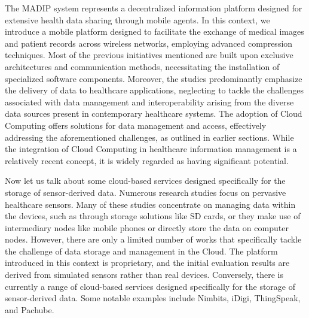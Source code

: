\documentclass{article}
\begin{document}
The MADIP system represents a decentralized information platform designed for extensive health data sharing through mobile agents. In this context, we introduce a mobile platform designed to facilitate the exchange of medical images and patient records across wireless networks, employing advanced compression techniques. Most of the previous initiatives mentioned are built upon exclusive architectures and communication methods, necessitating the installation of specialized software components.
Moreover, the studies predominantly emphasize the delivery of data to healthcare applications, neglecting to tackle the challenges associated with data management and interoperability arising from the diverse data sources present in contemporary healthcare systems. The adoption of Cloud Computing offers solutions for data management and access, effectively addressing the aforementioned challenges, as outlined in earlier sections. While the integration of Cloud Computing in healthcare information management is a relatively recent concept, it is widely regarded as having significant potential.

Now let us talk about some cloud-based services designed specifically for the storage of sensor-derived data. Numerous research studies focus on pervasive healthcare sensors. Many of these studies concentrate on managing data within the devices, such as through storage solutions like SD cards, or they make use of intermediary nodes like mobile phones or directly store the data on computer nodes. However, there are only a limited number of works that specifically tackle the challenge of data storage and management in the Cloud. The platform introduced in this context is proprietary, and the initial evaluation results are derived from simulated sensors rather than real devices.
Conversely, there is currently a range of cloud-based services designed specifically for the storage of sensor-derived data. Some notable examples include Nimbits, iDigi, ThingSpeak, and Pachube.
\end{document}
